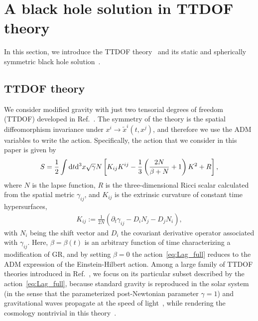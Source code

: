 \documentclass[aps,prd,preprintnumbers,superscriptaddress,nofootinbib,notitlepage]{revtex4-2}
\newcommand*{\D}{{\rm d}}
\begin{document}
\section{A black hole solution in TTDOF theory}

In this section, we introduce the TTDOF theory~\cite{Gao:2019twq} and its static and spherically symmetric black hole solution~\cite{Iyonaga:2021yfv}.



\subsection{TTDOF theory}

We consider modified gravity with just two tensorial degrees of freedom (TTDOF) developed in Ref.~\cite{Gao:2019twq}.
The symmetry of the theory is the spatial diffeomorphism invariance under
$x^i\to \tilde x^i(t,x^j)$, and therefore we use the ADM variables
to write the action. %
Specifically, the action that we consider in this paper is given by
\begin{align}
    S=\frac{1}{2}\int \D t\D^3 x \sqrt{\gamma}N\left[K_{ij}K^{ij}-\frac{1}{3}\left(\frac{2N}{\beta+N}+1\right)K^2+R\right], \label{eq:Lag_full}
\end{align}
where $N$ is the lapse function,
$R$ is the three-dimensional Ricci scalar calculated from the spatial metric $\gamma_{ij}$, and
$K_{ij}$ is the extrinsic curvature of constant time hypersurfaces,
\begin{align}
    K_{ij}:=\frac{1}{2N}\left(\partial_t \gamma_{ij}-D_i N_j-D_j N_i\right),
\end{align}
with $N_i$ being the shift vector and $D_i$ the covariant derivative operator associated with $\gamma_{ij}$.
Here, $\beta=\beta(t)$ is an arbitrary function of time characterizing a modification of GR,
and by setting $\beta=0$ the action~\eqref{eq:Lag_full}
reduces to the ADM expression of the Einstein-Hilbert action.
Among a large family of TTDOF theories introduced in Ref.~\cite{Gao:2019twq},
we focus on its particular subset described by the action~\eqref{eq:Lag_full},
because standard gravity is reproduced in the solar system
(in the sense that the parameterized post-Newtonian parameter $\gamma=1$)
and gravitational waves propagate at the speed of light~\cite{Iyonaga:2021yfv},
while rendering the cosmology nontrivial in this theory~\cite{Hiramatsu:2022ahs}.
\end{document}

